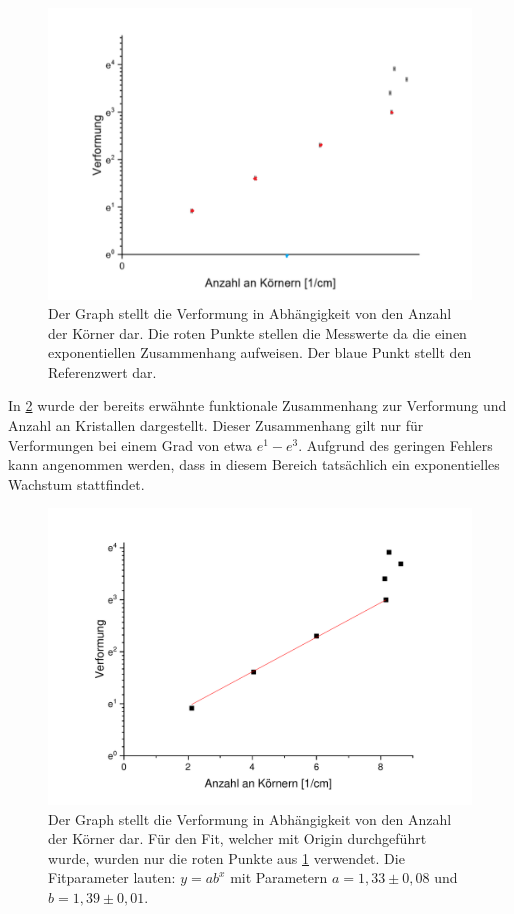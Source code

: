 \documentclass[
	a4paper,
	12pt,
	pagesize,
	ngerman
]{scrartcl}
\begin{document}
\begin{figure}[h!]
    \centering
    \includegraphics[scale = 0.6]{te.png}
    \caption{Der Graph stellt die Verformung in Abhängigkeit von den Anzahl der Körner dar. Die roten Punkte stellen die Messwerte da die einen exponentiellen Zusammenhang aufweisen. Der blaue Punkt stellt den Referenzwert dar.}
    \label{A2}
\end{figure}
In \cref{A3} wurde der bereits erwähnte funktionale Zusammenhang zur Verformung und Anzahl an Kristallen dargestellt. Dieser Zusammenhang gilt nur für Verformungen bei einem Grad von etwa $e^1 - e^3$. Aufgrund des geringen Fehlers kann angenommen werden, dass in diesem Bereich tatsächlich ein exponentielles Wachstum stattfindet.
\begin{figure}[h!]
    \centering
    \includegraphics[scale = 0.6]{fitfit.pdf}
    \caption{Der Graph stellt die Verformung in Abhängigkeit von den Anzahl der Körner dar. Für den Fit, welcher mit Origin durchgeführt wurde, wurden nur die roten Punkte aus \cref{A2} verwendet. Die Fitparameter lauten:
    $y=ab^x$ mit Parametern $a=1,33\pm 0,08$ und $b = 1,39 \pm 0,01$.}
    \label{A3}
\end{figure}
\end{document}
